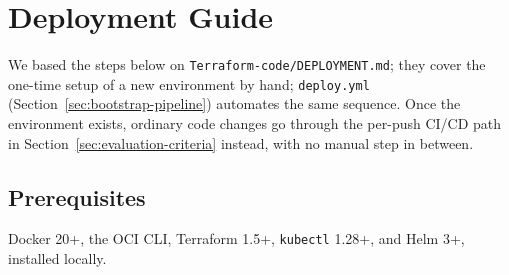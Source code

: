 \section{Deployment Guide}\label{sec:deployment-guide}
We based the steps below on \texttt{Terraform-\allowbreak code/\allowbreak DEPLOYMENT.md}; they cover the
one-time setup of a new environment by hand; \texttt{deploy.yml}
(Section~\ref{sec:bootstrap-pipeline}) automates the same sequence. Once the
environment exists, ordinary code changes go through the per-push CI/CD path in
Section~\ref{sec:evaluation-criteria} instead, with no manual step in between.

\subsection*{Prerequisites}
Docker 20+, the OCI CLI, Terraform 1.5+, \texttt{kubectl} 1.28+, and Helm 3+,
installed locally.


